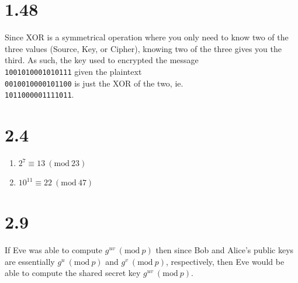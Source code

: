 \documentclass{article}
\newcommand{\Mod}[1]{\ (\mathrm{mod}\ #1)}
\begin{document}
\section*{1.48}
Since XOR is a symmetrical operation where you only need to
know two of the three values (Source, Key, or Cipher), knowing
two of the three gives you the third.
As such, the key used to encrypted the message \\

\noindent
\lstinline|1001010001010111| given the plaintext \\
\lstinline|0010010000101100| is just the XOR of the two, ie. \\
\lstinline|1011000001111011|.

\section*{2.4}
\begin{enumerate}[label=(\alph*)]
    \item $2^7 \equiv 13 \Mod{23}$
    \item $10^{11} \equiv 22 \Mod{47}$
\end{enumerate}

\section*{2.9}
If Eve was able to compute $g^{uv} \Mod{p}$ then since Bob and Alice's public keys
are essentially $g^u \Mod{p}$ and $g^v \Mod{p}$, respectively, then Eve would be able
to compute the shared secret key $g^{uv} \Mod{p}$.
\end{document}
